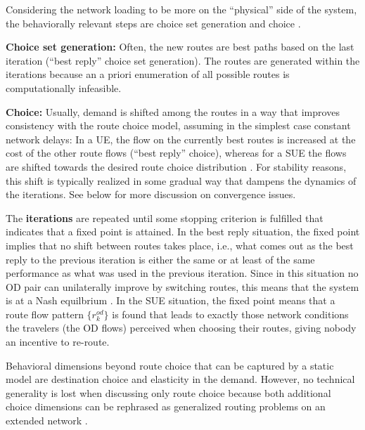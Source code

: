 Considering the network loading to be more on the ``physical'' side of the system, 
the behaviorally relevant steps are choice set generation and choice \citep{bowman-1998}.

\textbf{Choice set generation:} Often, the new routes are best paths
based on the last iteration (``best reply'' choice set generation).
The routes are generated within the iterations because an a priori
enumeration of all possible routes is computationally infeasible.

\textbf{Choice:} Usually, demand is shifted among the routes in a way
that improves consistency with the route choice model, assuming
in the simplest case
constant network delays: In a UE, the flow on the currently best routes
is increased at the cost of the other route flows (``best reply''
choice), whereas for a SUE the flows are shifted towards the desired
route choice distribution \citep[often a version of multinomial logit,
  e.g.,][]{dial-1971, cascetta-1996, ben-akiva-1999}. For
stability reasons, this shift is typically realized in some gradual
way that dampens the dynamics of the iterations. See below for more
discussion on convergence issues. 

The \textbf{iterations} are repeated until some stopping criterion is
fulfilled that indicates that a fixed point is attained.
In the best reply situation, the fixed point implies that no shift
between routes takes place, i.e., what comes out as the best reply to
the previous iteration is either the same or at least of the same
performance as what was used in the previous iteration.
Since in this situation no OD pair can unilaterally improve
by switching routes, this means that the system is at a Nash
equilbrium \citep[e.g.,][]{HofbSigmBook}.
In the SUE situation, the fixed point means that a route flow pattern 
$\{r^{od}_k\}$ is found that leads to exactly those network conditions the
travelers (the OD flows) perceived when choosing their routes,
giving nobody an incentive to re-route.

Behavioral dimensions beyond route choice that can be captured by a
static model are destination choice and elasticity in the
demand. However, no technical generality is lost when discussing only
route choice because both additional choice dimensions can be
rephrased as generalized routing problems on an extended network
\citep[``supernetwork''; see, e.g.,][]{sheffi-1985,NagurneyEtcSupernetworks}. 



